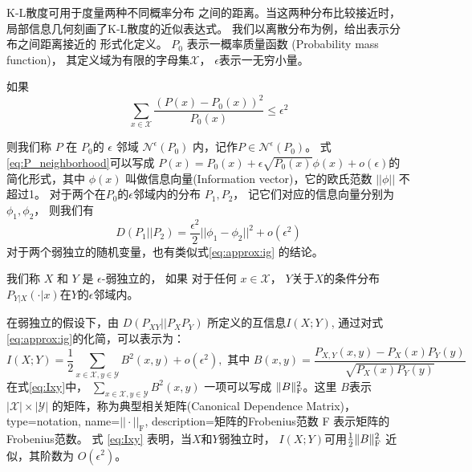 
K-L散度可用于度量两种不同概率分布
之间的距离。当这两种分布比较接近时，
局部信息几何刻画了K-L散度的近似表达式。
我们以离散分布为例，给出表示分布之间距离接近的
形式化定义。
$P_0$ 表示一概率质量函数 (Probability mass function)，
其定义域为有限的字母集$\mathcal{X}$，
$\epsilon$表示一无穷小量。
\begin{definition}\label{def:eps_neighborhood}
如果
\begin{equation}\label{eq:P_neighborhood}
\sum_{x \in \mathcal{X}} \frac{(P(x) - P_0(x))^2}{P_0(x)} \leq \epsilon^2
\end{equation}
\end{definition}
则我们称 $P$ 在 $P_0$的 $\epsilon$ 邻域 $\mathscr{N}^{\epsilon}(P_0)$ 内，记作$P \in \mathscr{N}^{\epsilon}(P_0)$。
式\eqref{eq:P_neighborhood}可以写成 $P(x) = P_0(x) + \epsilon
\sqrt{P_0(x)} \phi(x) + o(\epsilon)$的简化形式，其中 $\phi(x)$
叫做信息向量(Information vector)，它的欧氏范数 $||\phi || $ 不超过1。
对于两个在$P_0$的$\epsilon$邻域内的分布 $P_1, P_2$，
记它们对应的信息向量分别为$\phi_1, \phi_2$，
则我们有
\begin{equation}\label{eq:approx:ig}
D(P_1 || P_2) = \frac{\epsilon^2}{2} ||\phi_1 - \phi_2||^2 + o(\epsilon^2)
\end{equation}
对于两个弱独立的随机变量，也有类似式\eqref{eq:approx:ig}
的结论。
\begin{definition}\label{def:weak_indepedent}
我们称 $X$ 和 $Y$ 是 $\epsilon$-弱独立的，
如果 对于任何 $x \in \mathcal{X}$，
$Y$关于$X$的条件分布
$P_{Y|X}(\cdot |x)$在$Y$的$\epsilon$邻域内。
\end{definition}
在弱独立的假设下，由 $D(P_{XY}||P_XP_Y)$ 所定义的互信息$I(X;Y)$, 
通过对式\eqref{eq:approx:ig}的化简，可以表示为：
\begin{equation}\label{eq:Ixy}
I(X;Y) = \frac{1}{2}\sum_{x\in \mathcal{X}, y\in \mathcal{Y}} B^2(x,y) + o(\epsilon^2),
\textrm{ 其中 }  B(x,y)=\frac{P_{X,Y}(x,y) - P_X(x) P_Y(y)}{\sqrt{P_X(x)P_Y(y)}}
\end{equation}
在式\eqref{eq:Ixy}中， $\sum_{x\in \mathcal{X}, y\in \mathcal{Y}} B^2(x,y)$
一项可以写成 $\lVert B\rVert_{\mathrm{F}}^2$。这里 $B$表示$|\mathcal{X}| \times |\mathcal{Y}|$
的矩阵，称为典型相关矩阵(Canonical Dependence Matrix)\cite{huang2019universal}，
{
  type=notation,
  name={$||\cdot||_{\mathrm{F}}$},
  description={矩阵的Frobenius范数}
}
F 表示矩阵的Frobenius范数。
式 \eqref{eq:Ixy} 表明，当$X$和$Y$弱独立时，
$I(X;Y)$可用$\frac{1}{2} \lVert B\rVert_{\mathrm{F}}^2$
近似，其阶数为 $O(\epsilon^2)$。

